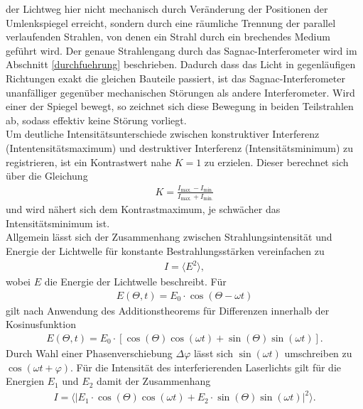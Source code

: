 der Lichtweg hier nicht mechanisch durch Veränderung der Positionen der
Umlenkspiegel erreicht, sondern durch eine räumliche Trennung der parallel
verlaufenden Strahlen, von denen ein Strahl durch ein brechendes Medium geführt
wird. Der genaue Strahlengang durch das Sagnac-Interferometer wird im Abschnitt
\ref{durchfuehrung} beschrieben. Dadurch dass das Licht in gegenläufigen
Richtungen exakt die gleichen Bauteile passiert, ist das Sagnac-Interferometer
unanfälliger gegenüber mechanischen Störungen als andere Interferometer. Wird
einer der Spiegel bewegt, so zeichnet sich diese Bewegung in beiden Teilstrahlen
ab, sodass effektiv keine Störung vorliegt. \\
\noindent Um deutliche Intensitätsunterschiede zwischen konstruktiver Interferenz
(Intentensitätsmaximum) und destruktiver Interferenz (Intensitätsminimum) zu
registrieren, ist ein Kontrastwert nahe $K = 1$ zu erzielen. Dieser berechnet
sich über die Gleichung
\begin{align}
  K = \frac{I_\text{max.}- I_\text{min.}}{I_\text{max.} + I_\text{min.}}
  \label{eqn:01}
\end{align}
\noindent und wird nähert sich dem Kontrastmaximum, je schwächer das
Intensitätsminimum ist. \\
\noindent Allgemein lässt sich der Zusammenhang zwischen Strahlungsintensität
und Energie der Lichtwelle für konstante Bestrahlungsstärken vereinfachen zu
\begin{align}
  I = \langle E^2 \rangle,
  \label{eqn:02}
\end{align}
\noindent wobei $E$ die Energie der Lichtwelle beschreibt. Für
\begin{align}
  E(\Theta, t) = E_0 \cdot \cos(\Theta - \omega t)
  \label{eqn:03}
\end{align}
\noindent gilt nach Anwendung des Additionstheorems für Differenzen innerhalb der
Kosinusfunktion
\begin{align}
  E(\Theta, t) = E_0 \cdot \left[\cos(\Theta) \cos(\omega t) + \sin(\Theta) \sin(\omega t) \right].
  \label{eqn:04}
\end{align}
\noindent Durch Wahl einer Phasenverschiebung $\Delta \varphi$ lässt sich
$\sin(\omega t)$ umschreiben zu $\cos(\omega t + \varphi)$. Für die Intensität
des interferierenden Laserlichts gilt für die Energien $E_1$ und $E_2$ damit
der Zusammenhang
\begin{align}
  I = \langle | E_1 \cdot \cos(\Theta) \cos(\omega t) + E_2 \cdot \sin(\Theta) \sin(\omega t) |^2 \rangle.
  \label{eqn:05}
\end{align}
